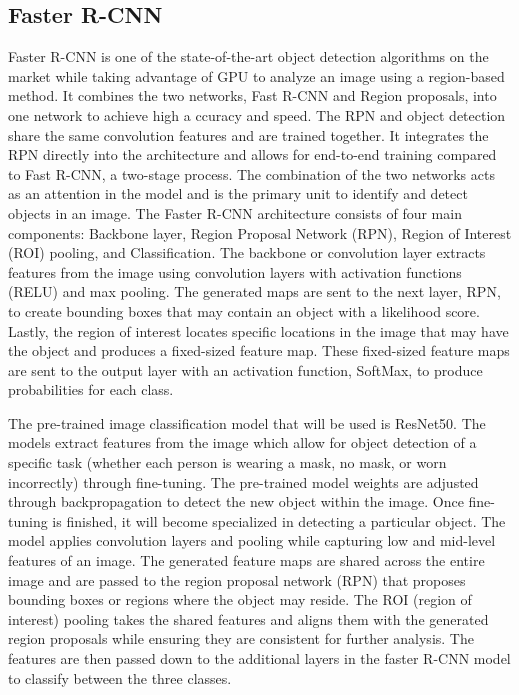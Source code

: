 \documentclass[conference]{IEEEtran}
\begin{document}
    \subsection{Faster R-CNN}
    Faster R-CNN is one of the state-of-the-art object detection algorithms on the market while taking advantage of GPU to 
    analyze an image using a region-based method. It combines the two networks, Fast R-CNN and Region proposals, into one network to achieve high a
    ccuracy and speed. The RPN and object detection share the same convolution features and are trained together. It integrates the RPN directly 
    into the architecture and allows for end-to-end training compared to Fast R-CNN, a two-stage process. The combination of the two networks acts 
    as an attention in the model and is the primary unit to identify and detect objects in an image. The Faster R-CNN architecture consists of 
    four main components: Backbone layer, Region Proposal Network (RPN), Region of Interest (ROI) pooling, and Classification. The backbone or 
    convolution layer extracts features from the image using convolution layers with activation functions (RELU) and max pooling. The generated 
    maps are sent to the next layer, RPN, to create bounding boxes that may contain an object with a likelihood score. Lastly, the region of interest 
    locates specific locations in the image that may have the object and produces a fixed-sized feature map. These fixed-sized feature maps are sent 
    to the output layer with an activation function, SoftMax, to produce probabilities for each class.

    The pre-trained image classification model that will be used is ResNet50. The models extract features from the image which allow for object detection of a 
    specific task (whether each person is wearing a mask, no mask, or worn incorrectly) through fine-tuning. The pre-trained model 
    weights are adjusted through backpropagation to detect the new object within the image. Once fine-tuning is finished, it will become specialized in detecting 
    a particular object. The model applies convolution layers and pooling while capturing low and mid-level features of an image. The generated feature maps are 
    shared across the entire image and are passed to the region proposal network (RPN) that proposes bounding boxes or regions where the object may reside. The 
    ROI (region of interest) pooling takes the shared features and aligns them with the generated region proposals while ensuring they are consistent for further 
    analysis. The features are then passed down to the additional layers in the faster R-CNN model to classify between the three classes.
\end{document}
